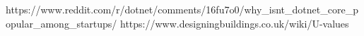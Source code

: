 https://www.reddit.com/r/dotnet/comments/16fu7o0/why_isnt_dotnet_core_popular_among_startups/
https://www.designingbuildings.co.uk/wiki/U-values